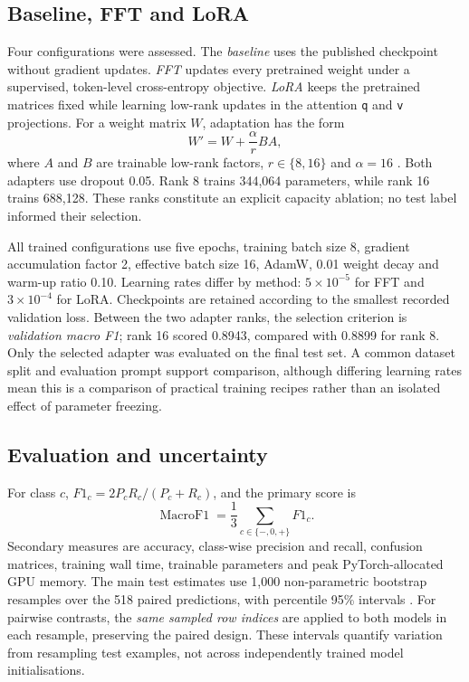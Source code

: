 \documentclass[conference,a4paper]{IEEEtran}
\begin{document}
\subsection{Baseline, FFT and LoRA}
Four configurations were assessed. The \emph{baseline} uses the published checkpoint without gradient updates. \emph{FFT} updates every pretrained weight under a supervised, token-level cross-entropy objective. \emph{LoRA} keeps the pretrained matrices fixed while learning low-rank updates in the attention \texttt{q} and \texttt{v} projections. For a weight matrix $W$, adaptation has the form
\begin{equation}
W' = W + \frac{\alpha}{r} BA,
\label{eq:lora}
\end{equation}
where $A$ and $B$ are trainable low-rank factors, $r\in\{8,16\}$ and $\alpha=16$ \cite{hu2022}. Both adapters use dropout 0.05. Rank 8 trains 344,064 parameters, while rank 16 trains 688,128. These ranks constitute an explicit capacity ablation; no test label informed their selection.

All trained configurations use five epochs, training batch size 8, gradient accumulation factor 2, effective batch size 16, AdamW, 0.01 weight decay and warm-up ratio 0.10. Learning rates differ by method: $5\times10^{-5}$ for FFT and $3\times10^{-4}$ for LoRA. Checkpoints are retained according to the smallest recorded validation loss. Between the two adapter ranks, the selection criterion is \emph{validation macro F1}; rank 16 scored 0.8943, compared with 0.8899 for rank 8. Only the selected adapter was evaluated on the final test set. A common dataset split and evaluation prompt support comparison, although differing learning rates mean this is a comparison of practical training recipes rather than an isolated effect of parameter freezing.

\subsection{Evaluation and uncertainty}
For class $c$, $F1_c=2P_cR_c/(P_c+R_c)$, and the primary score is
\begin{equation}
\operatorname{MacroF1}=\frac{1}{3}\sum_{c\in\{-,0,+\}}F1_c.
\end{equation}
Secondary measures are accuracy, class-wise precision and recall, confusion matrices, training wall time, trainable parameters and peak PyTorch-allocated GPU memory. The main test estimates use 1,000 non-parametric bootstrap resamples over the 518 paired predictions, with percentile 95\% intervals \cite{efron1993}. For pairwise contrasts, the \emph{same sampled row indices} are applied to both models in each resample, preserving the paired design. These intervals quantify variation from resampling test examples, not across independently trained model initialisations.
\end{document}
